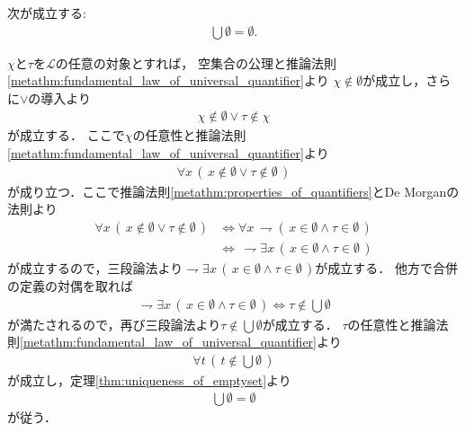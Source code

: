 	\begin{screen}
		\begin{thm}[空集合の合併は空]\label{thm:the_union_of_the_emptyset_is_empty}
			次が成立する:
			\begin{align}
				\bigcup \emptyset = \emptyset.
			\end{align}
		\end{thm}
	\end{screen}
	
	\begin{prf}
				$\chi$と$\tau$を$\mathcal{L}$の任意の対象とすれば，
				空集合の公理と推論法則\ref{metathm:fundamental_law_of_universal_quantifier}より
				$\chi \notin \emptyset$が成立し，さらに$\vee$の導入より
				\begin{align}
					\chi \notin \emptyset \vee \tau \notin \chi
				\end{align}
				が成立する．
				ここで$\chi$の任意性と推論法則\ref{metathm:fundamental_law_of_universal_quantifier}より
				\begin{align}
					\forall x\, (\, x \notin \emptyset \vee \tau \notin \emptyset\, )
				\end{align}
				が成り立つ．ここで推論法則\ref{metathm:properties_of_quantifiers}とDe Morganの法則より
				\begin{align}
					\forall x\, (\, x \notin \emptyset \vee \tau \notin \emptyset\, )
					&\Longleftrightarrow \forall x\, \rightharpoondown (\, x \in \emptyset \wedge \tau \in \emptyset\, ) \\
					&\Longleftrightarrow\, \rightharpoondown \exists x\, (\, x \in \emptyset \wedge \tau \in \emptyset\, )
				\end{align}
				が成立するので，三段論法より$\rightharpoondown \exists x\, (\, x \in \emptyset \wedge \tau \in \emptyset\, )$が成立する．
				他方で合併の定義の対偶を取れば
				\begin{align}
					\rightharpoondown \exists x\, (\, x \in \emptyset \wedge \tau \in \emptyset\, )
					\Longleftrightarrow \tau \notin \bigcup \emptyset
				\end{align}
				が満たされるので，再び三段論法より$\tau \notin \bigcup \emptyset$が成立する．
				$\tau$の任意性と推論法則\ref{metathm:fundamental_law_of_universal_quantifier}より
				\begin{align}
					\forall t\, (\, t \notin \bigcup \emptyset\, )
				\end{align}
				が成立し，定理\ref{thm:uniqueness_of_emptyset}より
				\begin{align}
					\bigcup \emptyset = \emptyset
				\end{align}
				が従う．
				\QED
	\end{prf}
	
